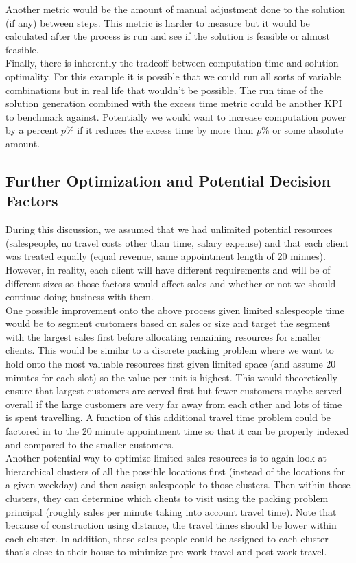 \documentclass{article}
\begin{document}
Another metric would be the amount of manual adjustment done to the solution (if any) between steps.  This metric is harder to measure but it would be calculated after the process is run and see if the solution is feasible or almost feasible.\\

Finally, there is inherently the tradeoff between computation time and solution optimality.  For this example it is possible that we could run all sorts of variable combinations but in real life that wouldn't be possible.  The run time of the solution generation combined with the excess time metric could be another KPI to benchmark against. Potentially we would want to increase computation power by a percent $p\%$ if it reduces the excess time by more than $p\%$ or some absolute amount.\\

\subsection{Further Optimization and Potential Decision Factors}
During this discussion, we assumed that we had unlimited potential resources (salespeople, no travel costs other than time, salary expense) and that each client was treated equally (equal revenue, same appointment length of 20 minues).  However, in reality, each client will have different requirements and will be of different sizes so those factors would affect sales and whether or not we should continue doing business with them.\\

One possible improvement onto the above process given limited salespeople time would be to segment customers based on sales or size and target the segment with the largest sales first before allocating remaining resources for smaller clients.  This would be similar to a discrete packing problem where we want to hold onto the most valuable resources first given limited space (and assume 20 minutes for each slot) so the value per unit is highest. This would theoretically ensure that largest customers are served first but fewer customers maybe served overall if the large customers are very far away from each other and lots of time is spent travelling.  A function of this additional travel time problem could be factored in to the 20 minute appointment time so that it can be properly indexed and compared to the smaller customers.\\

Another potential way to optimize limited sales resources is to again look at hierarchical clusters of all the possible locations first (instead of the locations for a given weekday) and then assign salespeople to those clusters.  Then within those clusters, they can determine which clients to visit using the packing problem principal (roughly sales per minute taking into account travel time).  Note that because of construction using distance, the travel times should be lower within each cluster.  In addition, these sales people could be assigned to each cluster that's close to their house to minimize pre work travel and post work travel.\\ 
\end{document}
